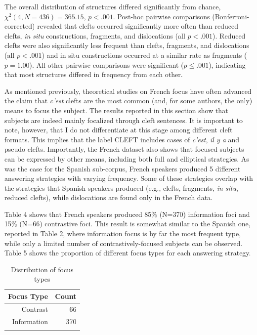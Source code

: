 The overall distribution of structures differed significantly from chance, $\chi^2(4, N = 436) = 365.15$, $p < .001$. Post-hoc pairwise comparisons (Bonferroni-corrected) revealed that clefts occurred significantly more often than reduced clefts, \textit{in situ} constructions, fragments, and dislocations (all $p < .001$). Reduced clefts were also significantly less frequent than clefts, fragments, and dislocations (all $p < .001$) and in situ constructions occurred at a similar rate as fragments ($p = 1.00$). All other pairwise comparisons were significant ($p \leq .001$), indicating that most structures differed in frequency from each other.

As mentioned previously, theoretical studies on French focus have often advanced the claim that \textit{c'est} clefts are the most common (and, for some authors, the only) means to focus the subject. The results reported in this section show that subjects are indeed mainly focalized through cleft sentences. It is important to note, however, that I do not differentiate at this stage among different cleft formats. This implies that the label {\selectfont CLEFT} includes cases of \textit{c'est}, \textit{il y a} and pseudo clefts. Importantly, the French dataset also shows that focused subjects can be expressed by other means, including both full and elliptical strategies. As was the case for the Spanish sub-corpus, French speakers produced 5 different answering strategies with varying frequency. Some of these strategies overlap with the strategies that Spanish speakers produced (e.g., clefts, fragments, \textit{in situ}, reduced clefts), while dislocations are found only in the French data.

Table 4 shows that French speakers produced 85\% (N=370) information foci and 15\% (N=66) contrastive foci. This result is somewhat similar to the Spanish one, reported in Table 2, where information focus is by far the most frequent type, while only a limited number of contrastively-focused subjects can be observed. Table 5 shows the proportion of different focus types for each answering strategy.

\begin{table}[ht]
\centering
\begin{tabular}{rr}
  \lsptoprule
Focus Type & Count \\ 
  \midrule
 {Contrast} &  66 \\
 {Information} & 370 \\
   \lspbottomrule
\end{tabular}
\caption{Distribution of focus types}
\end{table}

